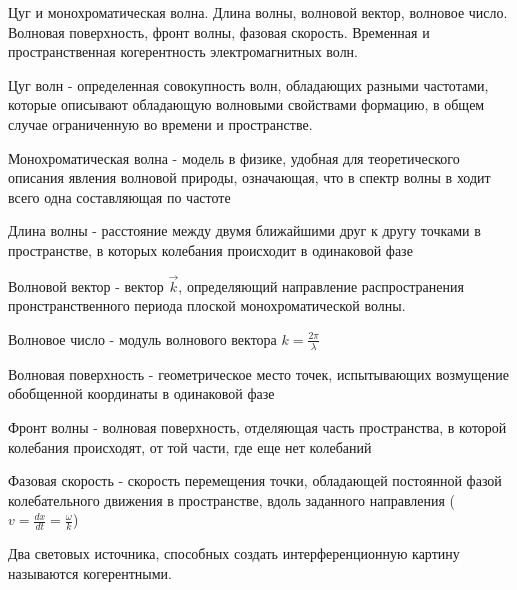 ﻿\documentclass[__main__.tex]{subfiles}
\begin{document}
Цуг и монохроматическая волна. Длина волны, волновой вектор, волновое число. Волновая поверхность, фронт волны, фазовая скорость. Временная и пространственная когерентность электромагнитных волн.\\ 

\begin{definition}
	Цуг волн - определенная совокупность волн, обладающих разными частотами, которые описывают обладающую волновыми свойствами формацию, в общем случае ограниченную во времени и пространстве.
\end{definition}
\begin{definition}
	Монохроматическая волна - модель в физике, удобная для теоретического описания явления волновой природы, означающая, что в спектр волны в ходит всего одна составляющая по частоте 
\end{definition}
\begin{definition}
	Длина волны - расстояние между двумя ближайшими друг к другу точками в пространстве, в которых колебания происходит в одинаковой фазе
\end{definition}
\begin{definition}
	Волновой вектор - вектор $\vec k$, определяющий направление распространения пронстранственного периода плоской монохроматической волны.
\end{definition}
\begin{definition}
	Волновое число - модуль волнового вектора $k = \frac{2\pi}{\lambda}$
\end{definition}
\begin{definition}
	Волновая поверхность - геометрическое место точек, испытывающих возмущение обобщенной координаты в одинаковой фазе
\end{definition}
\begin{definition}
	Фронт волны - волновая поверхность, отделяющая часть пространства, в которой колебания происходят, от той части, где еще нет колебаний
\end{definition}
\begin{definition}
	Фазовая скорость - скорость перемещения точки, обладающей постоянной фазой колебательного движения в пространстве, вдоль заданного направления ($v = \frac{dx}{dt} = \frac{\omega}{k}$)
\end{definition}

\begin{definition}
	Два световых источника, способных создать интерференционную картину называются когерентными.
\end{definition}
\end{document}
